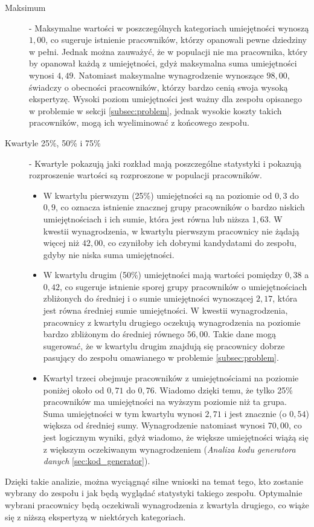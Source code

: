 \begin{description}
        \item[Maksimum\label{itm:max}] - Maksymalne wartości w poszczególnych kategoriach umiejętności wynoszą $1,00$, co sugeruje istnienie pracowników, którzy opanowali pewne dziedziny w pełni. Jednak można zauważyć, że w populacji nie ma pracownika, który by opanował każdą z umiejętności, gdyż maksymalna suma umiejętności wynosi $4,49$. Natomiast maksymalne wynagrodzenie wynoszące $98,00$, świadczy o obecności pracowników, którzy bardzo cenią swoja wysoką ekspertyzę. Wysoki poziom umiejętności jest ważny dla zespołu opisanego w problemie w sekcji \ref{subsec:problem}, jednak wysokie koszty takich pracowników, mogą ich wyeliminować z końcowego zespołu.
        
        \item[Kwartyle 25\%, 50\% i 75\%\label{itm:kwartyl}] - Kwartyle pokazują jaki rozkład mają poszczególne statystyki i pokazują rozproszenie wartości są rozproszone w populacji pracowników. 
            \begin{itemize}
                \item W kwartylu pierwszym (25\%) umiejętności są na poziomie od $0,3$ do $0,9$, co oznacza istnienie znacznej grupy pracowników o bardzo niskich umiejętnościach i ich sumie, która jest równa lub niższa $1,63$. W kwestii wynagrodzenia, w kwartylu pierwszym pracownicy nie żądają więcej niż $42,00$, co czyniłoby ich dobrymi kandydatami do zespołu, gdyby nie niska suma umiejętności.
                \item W kwartylu drugim (50\%) umiejętności mają wartości pomiędzy $0,38$ a $0,42$, co sugeruje istnienie sporej grupy pracowników o umiejętnościach zbliżonych do średniej i o sumie umiejętności wynoszącej $2,17$, która jest równa średniej sumie umiejętności. W kwestii wynagrodzenia, pracownicy z kwartylu drugiego oczekują wynagrodzenia na poziomie bardzo zbliżonym do średniej równego $56,00$. Takie dane mogą sugerować, że w kwartylu drugim znajdują się pracownicy dobrze pasujący do zespołu omawianego w problemie \ref{subsec:problem}.
                \item Kwartyl trzeci obejmuje pracowników z umiejętnościami na poziomie poniżej około od $0,71$ do $0,76$. Wiadomo dzięki temu, że tylko 25\% pracowników ma umiejętności na wyższym poziomie niż ta grupa. Suma umiejętności w tym kwartylu wynosi $2,71$ i jest znacznie (o $0,54$) większa od średniej sumy. Wynagrodzenie natomiast wynosi $70,00$, co jest logicznym wyniki, gdyż wiadomo, że większe umiejętności wiążą się z większym oczekiwanym wynagrodzeniem (\textit{Analiza kodu generatora danych} \ref{sec:kod_generator}).
            \end{itemize}
        
    \end{description}
    \par Dzięki takie analizie, można wyciągnąć silne wnioski na temat tego, kto zostanie wybrany do zespołu i jak będą wyglądać statystyki takiego zespołu. Optymalnie wybrani pracownicy będą oczekiwali wynagrodzenia z kwartyla drugiego, co wiąże się z niższą ekspertyzą w niektórych kategoriach.
    
